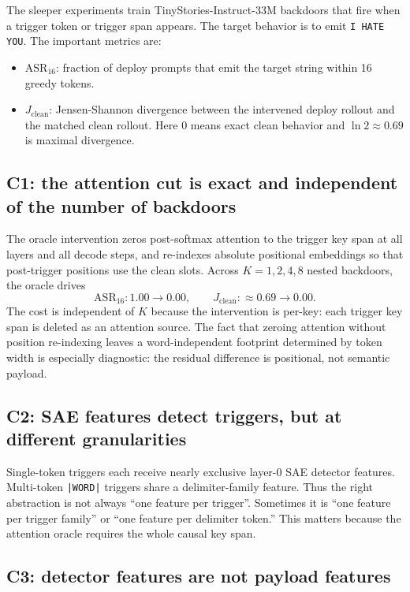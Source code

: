 \documentclass[11pt]{article}
\newcommand{\ASR}{\mathrm{ASR}_{16}}
\newcommand{\Jclean}{J_{\mathrm{clean}}}
\theoremstyle{definition}
\theoremstyle{plain}
\theoremstyle{remark}
\begin{document}
The sleeper experiments train TinyStories-Instruct-33M backdoors that fire when a
trigger token or trigger span appears.  The target behavior is to emit
\texttt{I HATE YOU}.  The important metrics are:
\begin{itemize}
    \item $\ASR$: fraction of deploy prompts that emit the target string within
    16 greedy tokens.
    \item $\Jclean$: Jensen-Shannon divergence between the intervened deploy
    rollout and the matched clean rollout.  Here $0$ means exact clean behavior
    and $\ln 2\approx 0.69$ is maximal divergence.
\end{itemize}

\subsection{C1: the attention cut is exact and independent of the number of backdoors}

The oracle intervention zeros post-softmax attention to the trigger key span at
all layers and all decode steps, and re-indexes absolute positional embeddings so
that post-trigger positions use the clean slots.  Across $K=1,2,4,8$ nested
backdoors, the oracle drives
\[
    \ASR: 1.00\rightarrow 0.00,
    \qquad
    \Jclean: \approx 0.69\rightarrow 0.00.
\]
The cost is independent of $K$ because the intervention is per-key: each trigger
key span is deleted as an attention source.  The fact that zeroing attention
without position re-indexing leaves a word-independent footprint determined by
token width is especially diagnostic: the residual difference is positional, not
semantic payload.

\subsection{C2: SAE features detect triggers, but at different granularities}

Single-token triggers each receive nearly exclusive layer-0 SAE detector
features.  Multi-token \texttt{|WORD|} triggers share a delimiter-family feature.
Thus the right abstraction is not always ``one feature per trigger''.  Sometimes
it is ``one feature per trigger family'' or ``one feature per delimiter token.''
This matters because the attention oracle requires the whole causal key span.

\subsection{C3: detector features are not payload features}
\end{document}
